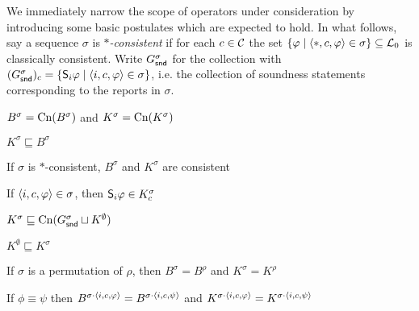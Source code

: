 We immediately narrow the scope of operators under consideration by introducing
some basic postulates which are expected to hold. In what follows, say a
sequence $\sigma$ is \emph{$\ast$-consistent} if for each $c \in \C$ the set
$\{\phi \mid \tuple{\ast, c, \phi} \in \sigma\} \subseteq \lprop$ is
classically consistent. Write $G^\sigma_\snd$ for the collection with
$(G^\sigma_\snd)_c = \{\S_i\phi \mid \tuple{i, c, \phi} \in \sigma\}$, i.e.
the collection of soundness statements corresponding to the reports in
$\sigma$.

\begin{postulate}[\closure{}]
    $B^\sigma = \cn(B^\sigma)$ and  $K^\sigma = \cn(K^\sigma)$
\end{postulate}
\begin{postulate}[\containment{}]
    $K^\sigma \sqsubseteq B^\sigma$
\end{postulate}
\begin{postulate}[\consistency{}]
    If $\sigma$ is $\ast$-consistent, $B^\sigma$ and $K^\sigma$ are
    consistent
\end{postulate}
\begin{postulate}[\soundness{}]
    If $\tuple{i, c, \phi} \in \sigma$, then $\S_i\phi \in K^\sigma_c$
\end{postulate}
\begin{postulate}[\kbound{}]
    $K^\sigma \sqsubseteq \cn(G^\sigma_\snd \sqcup K^\emptyset)$
\end{postulate}
\begin{postulate}[\priorext{}]
    $K^\emptyset \sqsubseteq K^\sigma$
\end{postulate}
\begin{postulate}[\rearr{}]
    If $\sigma$ is a permutation of $\rho$, then $B^\sigma = B^\rho$ and
    $K^\sigma = K^\rho$
\end{postulate}
\begin{postulate}[\equivpost{}]
    If $\phi \equiv \psi$ then $B^{\sigma \concat \tuple{i, c, \phi}} = B^{\sigma
    \concat \tuple{i, c, \psi}}$ and $K^{\sigma \concat \tuple{i, c, \phi}} =
    K^{\sigma \concat \tuple{i, c, \psi}}$
\end{postulate}

